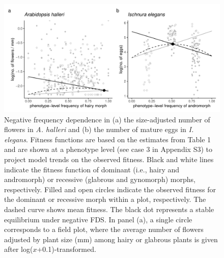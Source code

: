 \documentclass[12pt,]{article}
\begin{document}
\begin{figure}[ht]
  \includegraphics[width=0.75\linewidth]{Ah_Ie_plots.pdf}
  \caption{Negative frequency dependence in (a) the size-adjusted number of flowers in \textit{A. halleri} and (b) the number of mature eggs in \textit{I. elegans}. Fitness functions are based on the estimates from Table 1 and are shown at a phenotype level (see case 3 in Appendix S3) to project model trends on the observed fitness. Black and white lines indicate the fitness function of dominant (i.e., hairy and andromorph) or recessive (glabrous and gynomorph) morphs, respectively. Filled and open circles indicate the observed fitness for the dominant or recessive morph within a plot, respectively. The dashed curve shows mean fitness. The black dot represents a stable equilibrium under negative FDS. In panel (a), a single circle corresponds to a field plot, where the average number of flowers adjusted by plant size (mm) among hairy or glabrous plants is given after log($x$+0.1)-transformed.}
  \label{fig3:GLMM}
\end{figure}
\end{document}
